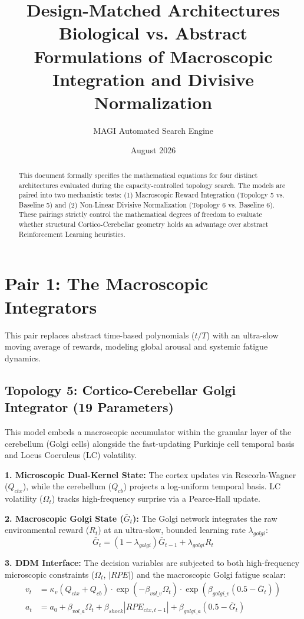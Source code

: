﻿\documentclass[12pt]{article}
\title{\textbf{Design-Matched Architectures} \\
\Large{Biological vs. Abstract Formulations of Macroscopic Integration and Divisive Normalization}}
\author{MAGI Automated Search Engine}
\date{August 2026}
\begin{document}
\maketitle

\begin{abstract}
This document formally specifies the mathematical equations for four distinct architectures evaluated during the capacity-controlled topology search. The models are paired into two mechanistic tests: (1) Macroscopic Reward Integration (Topology 5 vs. Baseline 5) and (2) Non-Linear Divisive Normalization (Topology 6 vs. Baseline 6). These pairings strictly control the mathematical degrees of freedom to evaluate whether structural Cortico-Cerebellar geometry holds an advantage over abstract Reinforcement Learning heuristics.
\end{abstract}

\section{Pair 1: The Macroscopic Integrators}
This pair replaces abstract time-based polynomials ($t/T$) with an ultra-slow moving average of rewards, modeling global arousal and systemic fatigue dynamics.

\subsection{Topology 5: Cortico-Cerebellar Golgi Integrator (19 Parameters)}
This model embeds a macroscopic accumulator within the granular layer of the cerebellum (Golgi cells) alongside the fast-updating Purkinje cell temporal basis and Locus Coeruleus (LC) volatility.

\textbf{1. Microscopic Dual-Kernel State:}
The cortex updates via Rescorla-Wagner ($Q_{ctx}$), while the cerebellum ($Q_{cb}$) projects a log-uniform temporal basis. LC volatility ($\Omega_t$) tracks high-frequency surprise via a Pearce-Hall update.

\textbf{2. Macroscopic Golgi State ($\bar{G}_t$):}
The Golgi network integrates the raw environmental reward ($R_t$) at an ultra-slow, bounded learning rate $\lambda_{golgi}$:
\begin{equation}
    \bar{G}_t = (1 - \lambda_{golgi}) \bar{G}_{t-1} + \lambda_{golgi} R_t
\end{equation}

\textbf{3. DDM Interface:}
The decision variables are subjected to both high-frequency microscopic constraints ($\Omega_t$, $|RPE|$) and the macroscopic Golgi fatigue scalar:
\begin{align}
    v_t &= \kappa_v (Q_{ctx} + Q_{cb}) \cdot \exp(-\beta_{vol\_v}\Omega_t) \cdot \exp\left(\beta_{golgi\_v}(0.5 - \bar{G}_t)\right) \\
    a_t &= a_0 + \beta_{vol\_a}\Omega_t + \beta_{shock}|RPE_{ctx,t-1}| + \beta_{golgi\_a}(0.5 - \bar{G}_t)
\end{align}
\end{document}

